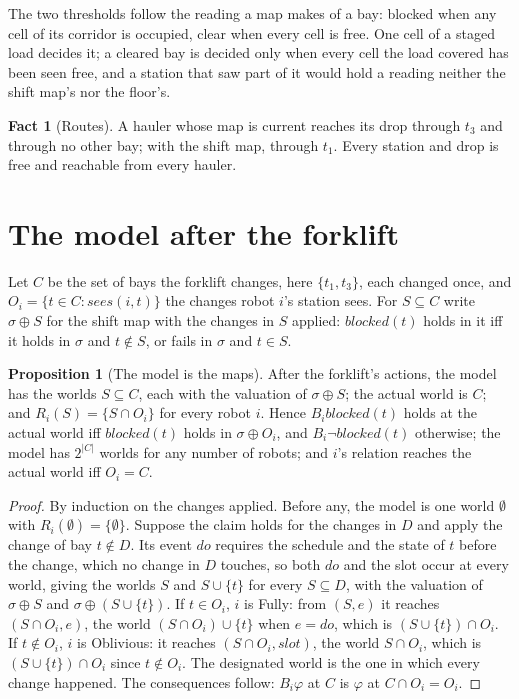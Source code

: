 \documentclass[11pt,a4paper]{article}
\theoremstyle{definition}
\newtheorem{proposition}{Proposition}
\newtheorem{fact}{Fact}
\newcommand{\blocked}{\mathit{blocked}}
\newcommand{\sees}{\mathit{sees}}
\newcommand{\Bop}[1]{B_{#1}}
\newcommand{\Obs}{O}
\newcommand{\shift}{\sigma}
\begin{document}
The two thresholds follow the reading a map makes of a bay: blocked when any cell
of its corridor is occupied, clear when every cell is free. One cell of a staged
load decides it; a cleared bay is decided only when every cell the load covered
has been seen free, and a station that saw part of it would hold a reading
neither the shift map's nor the floor's.

\begin{fact}[Routes]
A hauler whose map is current reaches its drop through $t_3$ and through no other
bay; with the shift map, through $t_1$. Every station and drop is free and
reachable from every hauler.
\end{fact}

\section{The model after the forklift}
\label{sec:model}

Let $C$ be the set of bays the forklift changes, here $\{t_1, t_3\}$, each changed
once, and $\Obs_i = \{t \in C : \sees(i,t)\}$ the changes robot $i$'s station
sees. For $S \subseteq C$ write $\shift \oplus S$ for the shift map with the
changes in $S$ applied: $\blocked(t)$ holds in it iff it holds in $\shift$ and
$t \notin S$, or fails in $\shift$ and $t \in S$.

\begin{proposition}[The model is the maps]
\label{prop:model}
After the forklift's actions, the model has the worlds $S \subseteq C$, each with
the valuation of $\shift \oplus S$; the actual world is $C$; and
$R_i(S) = \{S \cap \Obs_i\}$ for every robot $i$. Hence $\Bop{i}\blocked(t)$
holds at the actual world iff $\blocked(t)$ holds in $\shift \oplus \Obs_i$, and
$\Bop{i}\neg\blocked(t)$ otherwise; the model has $2^{|C|}$ worlds for any number
of robots; and $i$'s relation reaches the actual world iff $\Obs_i = C$.
\end{proposition}

\begin{proof}
By induction on the changes applied. Before any, the model is one world
$\emptyset$ with $R_i(\emptyset) = \{\emptyset\}$. Suppose the claim holds for the
changes in $D$ and apply the change of bay $t \notin D$. Its event $\mathit{do}$
requires the schedule and the state of $t$ before the change, which no change in
$D$ touches, so both $\mathit{do}$ and the slot occur at every world, giving the
worlds $S$ and $S \cup \{t\}$ for every $S \subseteq D$, with the valuation of
$\shift \oplus S$ and $\shift \oplus (S \cup \{t\})$. If $t \in \Obs_i$, $i$ is
Fully: from $(S, e)$ it reaches $(S \cap \Obs_i, e)$, the world
$(S \cap \Obs_i) \cup \{t\}$ when $e = \mathit{do}$, which is
$(S \cup \{t\}) \cap \Obs_i$. If $t \notin \Obs_i$, $i$ is Oblivious: it reaches
$(S \cap \Obs_i, \mathit{slot})$, the world $S \cap \Obs_i$, which is
$(S \cup \{t\}) \cap \Obs_i$ since $t \notin \Obs_i$. The designated world is the
one in which every change happened. The consequences follow:
$\Bop{i}\varphi$ at $C$ is $\varphi$ at $C \cap \Obs_i = \Obs_i$.
\end{proof}
\end{document}
